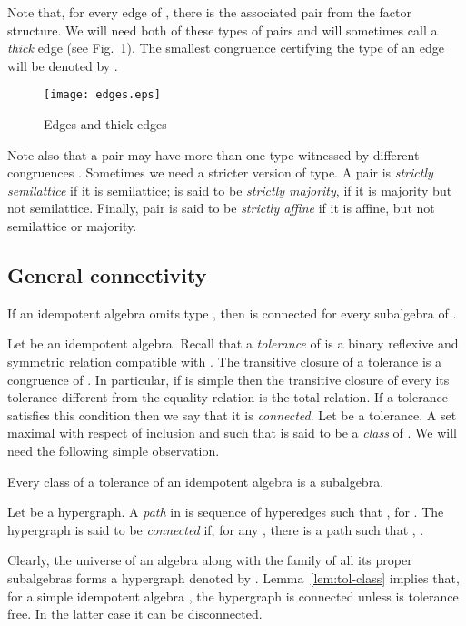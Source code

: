 \documentclass[11pt]{article}
\begin{document}
Note that, for every edge  of , there is the associated pair 
 from the factor structure. We will need both of these types of pairs 
and will sometimes call  a {\em thick} edge (see Fig.~1). The 
smallest congruence certifying the type of an edge  will be denoted by . 
\begin{figure}[t]
\centerline{\texttt{[image: edges.eps]}}
\caption{Edges and thick edges}
\end{figure}

Note also that a pair  may have more than one type witnessed by different 
congruences . Sometimes we need a stricter version of type. A pair 
is \emph{strictly semilattice} if it is semilattice;  is said to be \emph{strictly
majority}, if it is majority but not semilattice. Finally, pair  is said to be 
\emph{strictly affine} if it is affine, but not semilattice or majority.


\subsection{General connectivity}\label{sec:general-connectivity}

\begin{theorem}\label{the:connectedness}
If an idempotent algebra  omits type \one, then  is connected
for every subalgebra of .
\end{theorem}

Let  be an idempotent algebra. Recall that a {\em
tolerance} of  is a binary reflexive and symmetric
relation compatible with . The transitive closure of a tolerance is a
congruence of . In particular, if  is simple then the transitive
closure of every its tolerance different from the equality relation is
the total relation. If a tolerance satisfies this condition then we
say that it is {\em connected}. Let  be a tolerance. A set
 maximal with respect of inclusion and such that  is said to be a {\em class} of . We will need the following 
simple observation.
\begin{lemma}\label{lem:tol-class}
Every class of a tolerance of an idempotent algebra is a subalgebra.
\end{lemma}


Let  be a hypergraph. A {\em path} in 
is sequence  of hyperedges such that , 
for . The hypergraph  is said to be {\em connected} if,
for any , there is a path  such that ,
.

Clearly, the universe of an algebra  along with the family of all
its proper subalgebras forms a hypergraph denoted by
. Lemma~\ref{lem:tol-class} implies that, for a simple
idempotent algebra , the hypergraph  is connected unless 
 is tolerance free. In the latter case it can be disconnected.
\end{document}
